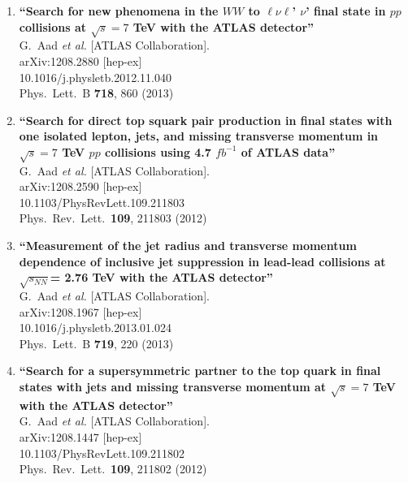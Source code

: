 \documentclass{article}
\begin{document}
\begin{enumerate}
\item%
{\bf ``Search for new phenomena in the $W W$ to $\ell \nu \ell$' $\nu$' final state in $pp$ collisions at $\sqrt{s}=7$ TeV with the ATLAS detector''}
  \\{}G.~Aad {\it et al.}  [ATLAS Collaboration].
  \\{}arXiv:1208.2880 [hep-ex]
    \\{}10.1016/j.physletb.2012.11.040
\\{}Phys.\ Lett.\ B {\bf 718}, 860 (2013) %


\item%
{\bf ``Search for direct top squark pair production in final states with one isolated lepton, jets, and missing transverse momentum in $\sqrt{s}=7$ TeV $pp$ collisions using 4.7 $fb^{-1}$ of ATLAS data''}
  \\{}G.~Aad {\it et al.}  [ATLAS Collaboration].
  \\{}arXiv:1208.2590 [hep-ex]
    \\{}10.1103/PhysRevLett.109.211803
\\{}Phys.\ Rev.\ Lett.\  {\bf 109}, 211803 (2012) %


\item%
{\bf ``Measurement of the jet radius and transverse momentum dependence of inclusive jet suppression in lead-lead collisions at $\sqrt{s_{NN}}$= 2.76 TeV with the ATLAS detector''}
  \\{}G.~Aad {\it et al.}  [ATLAS Collaboration].
  \\{}arXiv:1208.1967 [hep-ex]
    \\{}10.1016/j.physletb.2013.01.024
\\{}Phys.\ Lett.\ B {\bf 719}, 220 (2013) %


\item%
{\bf ``Search for a supersymmetric partner to the top quark in final states with jets and missing transverse momentum at $\sqrt{s}=7$ TeV with the ATLAS detector''}
  \\{}G.~Aad {\it et al.}  [ATLAS Collaboration].
  \\{}arXiv:1208.1447 [hep-ex]
    \\{}10.1103/PhysRevLett.109.211802
\\{}Phys.\ Rev.\ Lett.\  {\bf 109}, 211802 (2012) %



\end{enumerate}
\end{document}
